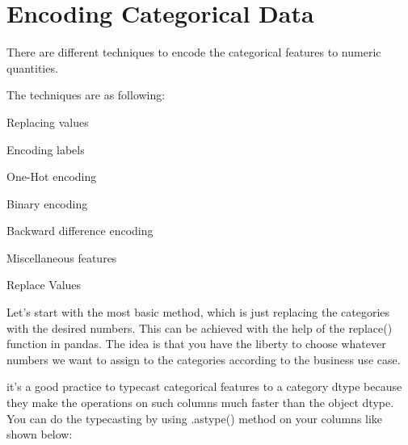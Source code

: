 \documentclass[11pt]{article}
\begin{document}
    \section{Encoding Categorical Data}\label{encoding-categorical-data}

There are different techniques to encode the categorical features to
numeric quantities.

The techniques are as following:

Replacing values

Encoding labels

One-Hot encoding

Binary encoding

Backward difference encoding

Miscellaneous features

Replace Values

Let's start with the most basic method, which is just replacing the
categories with the desired numbers. This can be achieved with the help
of the replace() function in pandas. The idea is that you have the
liberty to choose whatever numbers we want to assign to the categories
according to the business use case.

    it's a good practice to typecast categorical features to a category
dtype because they make the operations on such columns much faster than
the object dtype. You can do the typecasting by using .astype() method
on your columns like shown below:
\end{document}

